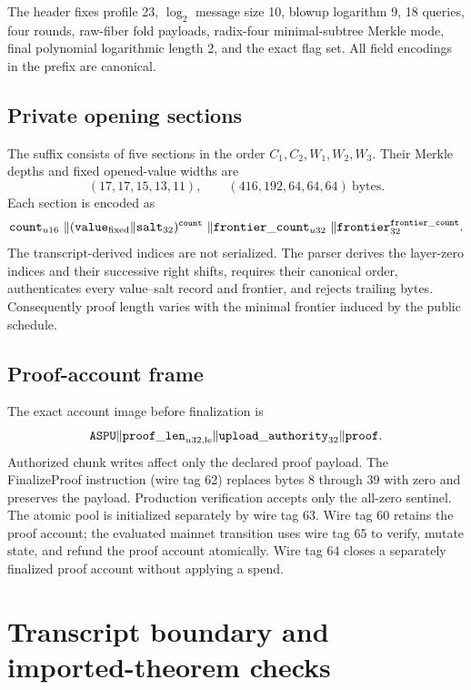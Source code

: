 The header fixes profile 23, \(\log_2\) message size 10, blowup logarithm 9,
18 queries, four rounds, raw-fiber fold payloads, radix-four minimal-subtree
Merkle mode, final polynomial logarithmic length 2, and the exact flag set.
All field encodings in the prefix are canonical.

\subsection{Private opening sections}

The suffix consists of five sections in the order \(C_1,C_2,W_1,W_2,W_3\).
Their Merkle depths and fixed opened-value widths are
\[
 (17,17,15,13,11),\qquad
 (416,192,64,64,64)\ \text{bytes}.
\]
Each section is encoded as
\[
 \mathtt{count}_{u16}\ \|
 (\mathtt{value}_{\rm fixed}\|\mathtt{salt}_{32})^{\mathtt{count}}\ \|
 \mathtt{frontier\_count}_{u32}\ \|
 \mathtt{frontier}_{32}^{\mathtt{frontier\_count}}.
\]
The transcript-derived indices are not serialized.  The parser derives the
layer-zero indices and their successive right shifts, requires their
canonical order, authenticates every value--salt record and frontier, and
rejects trailing bytes.  Consequently proof length varies with the minimal
frontier induced by the public schedule.

\subsection{Proof-account frame}

The exact account image before finalization is
\[
 \mathtt{ASPU}\|\mathtt{proof\_len}_{u32,\rm le}
 \|\mathtt{upload\_authority}_{32}\|\mathtt{proof}.
\]
Authorized chunk writes affect only the declared proof payload.  The
\textsf{FinalizeProof} instruction (wire tag 62) replaces bytes 8 through 39
with zero and preserves the payload.  Production verification accepts only
the all-zero sentinel.  The atomic pool is initialized separately by wire tag
63.  Wire tag 60 retains the proof account; the evaluated mainnet transition
uses wire tag 65 to verify, mutate state, and refund the proof account
atomically.  Wire tag 64 closes a separately finalized proof account without
applying a spend.

\section{Transcript boundary and imported-theorem checks}
\label{app:transcript-hypotheses}

